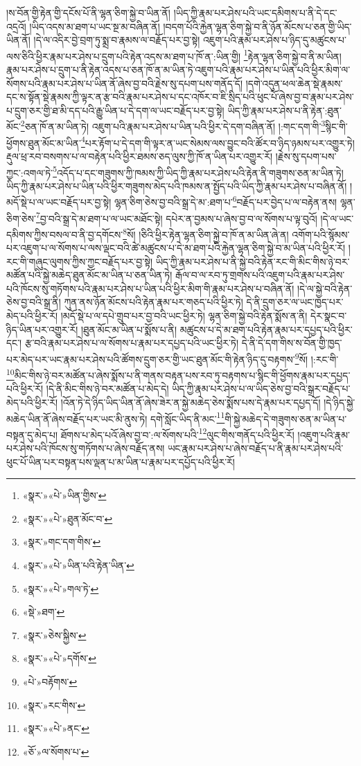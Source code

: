 །ས་བོན་གྱི་རྟེན་གྱི་དངོས་པོ་ནི་ལྷན་ཅིག་སྐྱེ་བ་ཡིན་ནོ། །ཡིད་ཀྱི་རྣམ་པར་ཤེས་པའི་ཡང་དམིགས་པ་ནི་དེ་དང་འདྲའོ། །ཡིད་འདས་མ་ཐག་པ་ཡང་སྔ་མ་བཞིན་ནོ། །བདག་པོའི་རྐྱེན་ལྷན་ཅིག་སྐྱེ་བ་ནི་ཉོན་མོངས་པ་ཅན་གྱི་ཡིད་ཡིན་ནོ། །དེ་ལ་འདིར་བྱེ་བྲག་ཏུ་སྨྲ་བ་རྣམས་ལ་བརྗོད་པར་བྱ་སྟེ། འཇུག་པའི་རྣམ་པར་ཤེས་པ་ཉིད་དུ་མཚུངས་པ་ལས་ཅིའི་ཕྱིར་རྣམ་པར་ཤེས་པ་དྲུག་པའི་རྟེན་འདས་མ་ཐག་པ་ཁོ་ན་:ཡིན་གྱི། \footnote{«སྣར་»«པེ་»ཡིན་གྱིས་}རྟེན་ལྷན་ཅིག་སྐྱེ་བ་ནི་མ་ཡིན། རྣམ་པར་ཤེས་པ་དྲུག་པ་ནི་རྟེན་འདས་པ་ཅན་ཁོ་ན་མ་ཡིན་ཏེ་འཇུག་པའི་རྣམ་པར་ཤེས་པ་ཡིན་པའི་ཕྱིར་མིག་ལ་སོགས་པའི་རྣམ་པར་ཤེས་པ་ཡིན་ནོ་ཞེས་བྱ་བའི་རྗེས་སུ་དཔག་པས་གནོད་དོ། །དགེ་འདུན་ཕལ་ཆེན་སྡེ་རྣམས་དང་ས་སྟོན་སྡེ་རྣམས་ཀྱི་ལྟར་ན་རྩ་བའི་རྣམ་པར་ཤེས་པ་དང་འཁོར་བ་ཇི་སྲིད་པའི་ཕུང་པོ་ཞེས་བྱ་བ་རྣམ་པར་ཤེས་པ་དྲུག་ཅར་གྱི་ཐ་མི་དད་པའི་རྒྱུ་ཡིན་པ་དེ་དག་ལ་ཡང་བརྗོད་པར་བྱ་སྟེ། ཡིད་ཀྱི་རྣམ་པར་ཤེས་པ་ནི་རྟེན་:ཐུན་མོང་\footnote{«སྣར་»«པེ་»ཐུན་མོང་བ་}ཅན་ཁོ་ན་མ་ཡིན་ཏེ། འཇུག་པའི་རྣམ་པར་ཤེས་པ་ཡིན་པའི་ཕྱིར་དེ་དག་བཞིན་ནོ། །:གང་དག་གི་\footnote{«སྣར་»གང་དག་གིས་}སྙིང་གི་ཕྱོགས་ཐུན་མོང་མ་ཡིན་\footnote{«སྣར་»«པེ་»ཡིན་པའི་རྟེན་ཡིན་}པར་རྟོག་པ་དེ་དག་གི་ལྟར་ན་ཡང་སེམས་ལས་བྱུང་བའི་ཚོར་བ་ཉིད་ཉམས་པར་འགྱུར་ཏེ། རྡུལ་ཕྲ་རབ་བསགས་པ་ལ་བརྟེན་པའི་ཕྱིར་ཐམས་ཅད་ལུས་ཀྱི་ཁོ་ན་ཡིན་པར་འགྱུར་རོ། །རྗེས་སུ་དཔག་པས་ཀྱང་:འགལ་ཏེ་\footnote{«སྣར་»«པེ་»གལ་ཏེ་}འདོད་པ་དང་གཟུགས་ཀྱི་ཁམས་ཀྱི་ཡིད་ཀྱི་རྣམ་པར་ཤེས་པའི་རྟེན་ནི་གཟུགས་ཅན་མ་ཡིན་ཏེ། ཡིད་ཀྱི་རྣམ་པར་ཤེས་པ་ཡིན་པའི་ཕྱིར་གཟུགས་མེད་པའི་ཁམས་ན་སྤྱོད་པའི་ཡིད་ཀྱི་རྣམ་པར་ཤེས་པ་བཞིན་ནོ། །མདོ་སྡེ་པ་ལ་ཡང་བརྗོད་པར་བྱ་སྟེ། ལྷན་ཅིག་ཅེས་བྱ་བའི་སྒྲ་དེ་མ་:ཐག་པ་\footnote{«སྡེ་»ཐག་}བརྗོད་པར་བྱེད་པ་ལ་བརྟེན་ནས། ལྷན་ཅིག་ཅེས་\footnote{«སྣར་»ཅེས་སྐྱིས་}བྱ་བའི་སྒྲ་དེ་མ་ཐག་པ་ལ་ཡང་མཐོང་སྟེ། དཔེར་ན་བྱམས་པ་ཞེས་བྱ་བ་ལ་སོགས་པ་ལྟ་བུའོ། །དེ་ལ་ཡང་དམིགས་ཀྱིས་བསལ་བ་ནི་བྱ་དགོངས་\footnote{«སྣར་»«པེ་»དགོས་}སོ། །ཅིའི་ཕྱིར་རྟེན་ལྷན་ཅིག་སྐྱེ་བ་ཁོ་ན་མ་ཡིན་ཞེ་ན། འགོག་པའི་སྙོམས་པར་འཇུག་པ་ལ་སོགས་པ་ལས་ལྡང་བའི་ཚེ་མཚུངས་པ་དེ་མ་ཐག་པའི་རྐྱེན་ལྷན་ཅིག་སྐྱེ་བ་མ་ཡིན་པའི་ཕྱིར་རོ། །རང་གི་གཞུང་ལུགས་ཀྱིས་ཀྱང་བརྗོད་པར་བྱ་སྟེ། ཡིད་ཀྱི་རྣམ་པར་ཤེས་པ་ནི་སྐྱེ་བའི་རྟེན་རང་གི་མིང་གིས་ཉེ་བར་མཚོན་པའི་སྐྱེ་མཆེད་ཐུན་མོང་མ་ཡིན་པ་ཅན་ཡིན་ཏེ། རྒོལ་བ་ལ་རབ་ཏུ་གྲགས་པའི་འཇུག་པའི་རྣམ་པར་ཤེས་པའི་ཁོངས་སུ་གཏོགས་པའི་རྣམ་པར་ཤེས་པ་ཡིན་པའི་ཕྱིར་མིག་གི་རྣམ་པར་ཤེས་པ་བཞིན་ནོ། །དེ་ལ་སྐྱེ་བའི་རྟེན་ཅེས་བྱ་བའི་སྒྲ་ནི། ཀུན་ནས་ཉོན་མོངས་པའི་རྟེན་རྣམ་པར་གཅད་པའི་ཕྱིར་ཏེ། དེ་ནི་དྲུག་ཅར་ལ་ཡང་ཁྱད་པར་མེད་པའི་ཕྱིར་རོ། །མདོ་སྡེ་པ་ལ་དཔེ་གྲུབ་པར་བྱ་བའི་ཡང་ཕྱིར་ཏེ། ལྷན་ཅིག་སྐྱེ་བའི་རྟེན་སྨོས་ན་ནི། དེར་སྣང་བ་ཉིད་ཡིན་པར་འགྱུར་རོ། །ཐུན་མོང་མ་ཡིན་པ་སྨོས་པ་ནི། མཚུངས་པ་དེ་མ་ཐག་པའི་རྟེན་རྣམ་པར་དཔྱད་པའི་ཕྱིར་དང་། རྩ་བའི་རྣམ་པར་ཤེས་པ་ལ་སོགས་པ་རྣམ་པར་དཔྱད་པའི་ཡང་ཕྱིར་ཏེ། དེ་ནི་དེ་དག་གིས་ས་བོན་གྱི་ཁྱད་པར་མེད་པར་ཡང་རྣམ་པར་ཤེས་པའི་ཚོགས་དྲུག་ཅར་གྱི་ཡང་ཐུན་མོང་གི་རྟེན་ཉིད་དུ་བརྟགས་\footnote{«པེ་»བརྟོགས་}སོ། །:རང་གི་\footnote{«སྣར་»རང་གིས་}མིང་གིས་ཉེ་བར་མཚོན་པ་ཞེས་སྨོས་པ་ནི་གནས་བརྟན་པས་རབ་ཏུ་བརྟགས་པ་སྙིང་གི་ཕྱོགས་རྣམ་པར་དཔྱད་པའི་ཕྱིར་རོ། །དེ་ནི་མིང་གིས་ཉེ་བར་མཚོན་པ་མེད་དེ། ཡིད་ཀྱི་རྣམ་པར་ཤེས་པ་ལ་ཡིད་ཅེས་བྱ་བའི་སྒྲར་བརྗོད་པ་མེད་པའི་ཕྱིར་རོ། །འོན་ཏེ་དེ་ཉིད་ཡིད་ཡིན་ནོ་ཞེས་ཟེར་ན་སྐྱེ་མཆེད་ཅེས་སྨོས་པས་དེ་རྣམ་པར་དཔྱད་དོ། །དེ་ཉིད་སྐྱེ་མཆེད་ཡིན་ནོ་ཞེས་བརྗོད་པར་ཡང་མི་ནུས་ཏེ། དགེ་སློང་ཡིད་ནི་མང་\footnote{«སྣར་»«པེ་»ནང་}གི་སྐྱེ་མཆེད་དེ་གཟུགས་ཅན་མ་ཡིན་པ་བསྟན་དུ་མེད་པ། ཐོགས་པ་མེད་པའོ་ཞེས་བྱ་བ་:ལ་སོགས་པའི་\footnote{«ཅོ་»ལ་སོགས་པ་}ལུང་གིས་གནོད་པའི་ཕྱིར་རོ། །འཇུག་པའི་རྣམ་པར་ཤེས་པའི་ཁོངས་སུ་གཏོགས་པ་ཞེས་བརྗོད་ནས། ཡང་རྣམ་པར་ཤེས་པ་ཞེས་བརྗོད་པ་ནི་རྣམ་པར་ཤེས་པའི་ཕུང་པོ་ཡིན་པར་བསྟན་པས་ལྡན་པ་མ་ཡིན་པ་རྣམ་པར་དཔྱོད་པའི་ཕྱིར་རོ། 